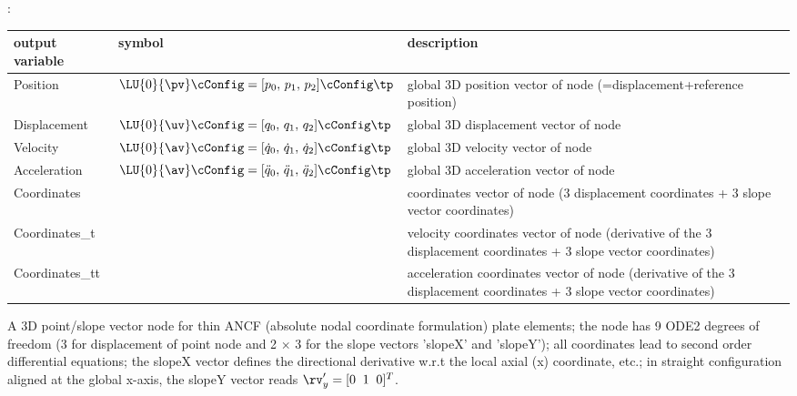 :
\begin{center}
\footnotesize
\begin{longtable}{| p{5cm} | p{5cm} | p{6cm} |} 
\hline
\bf output variable & \bf symbol & \bf description \\ \hline
Position & $\LU{0}{\pv}\cConfig = [p_0,\, p_1,\, p_2]\cConfig\tp$ & global 3D position vector of node (=displacement+reference position)\\ \hline
Displacement & $\LU{0}{\uv}\cConfig = [q_0,\, q_1,\, q_2]\cConfig\tp$ & global 3D displacement vector of node\\ \hline
Velocity & $\LU{0}{\av}\cConfig = [\dot q_0,\,\dot q_1,\,\dot q_2]\cConfig\tp$ & global 3D velocity vector of node\\ \hline
Acceleration & $\LU{0}{\av}\cConfig = [\ddot q_0,\,\ddot q_1,\,\ddot q_2]\cConfig\tp$ & global 3D acceleration vector of node\\ \hline
Coordinates &  & coordinates vector of node (3 displacement coordinates + 3 slope vector coordinates)\\ \hline
Coordinates\_t &  & velocity coordinates vector of node (derivative of the 3 displacement coordinates + 3 slope vector coordinates)\\ \hline
Coordinates\_tt &  & acceleration coordinates vector of node (derivative of the 3 displacement coordinates + 3 slope vector coordinates)\\ \hline
\end{longtable}
\end{center}
\newpage


\label{sec:item:NodePointSlope12}
A 3D point/slope vector node for thin ANCF (absolute nodal coordinate formulation) plate elements; the node has 9 ODE2 degrees of freedom (3 for displacement of point node and 2 $\times$ 3 for the slope vectors 'slopeX' and 'slopeY'); all coordinates lead to second order differential equations; the slopeX vector defines the directional derivative w.r.t the local axial (x) coordinate, etc.; in straight configuration aligned at the global x-axis, the slopeY vector reads $\rv_y^\prime=[0\;\;1\;\;0]^T$.
\vspace{12pt}\\

